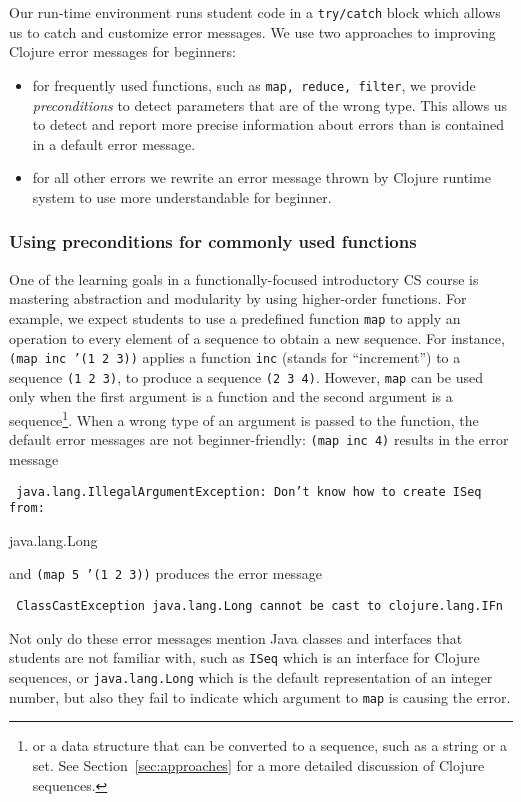 \documentclass[submission,copyright,creativecommons]{eptcs}
\newcommand{\clocode}[1]{{\tt {#1}}}
\begin{document}
Our run-time environment runs student code in a \clocode{try/catch} block which allows us to catch and customize error messages. 
We use two approaches to improving Clojure error messages for beginners:
\begin{itemize}
\item for frequently used functions, such as \clocode{map, reduce, filter}, we provide {\it preconditions}  to detect parameters that are of the wrong type. This allows us to detect and report more precise information about errors than is contained in a default error message. 
\item for all other errors we rewrite an error message thrown by Clojure runtime system to use more understandable for beginner. 
\end{itemize}

\subsubsection{Using preconditions for commonly used functions}\label{subsub:pre-cond}
One of the learning goals in a functionally-focused introductory CS course is mastering abstraction and modularity by using higher-order functions. For example, we expect students to use a predefined function \clocode{map} to apply an operation to every element of a sequence to obtain a new sequence. For instance, \clocode{(map inc '(1 2 3))} applies a function \clocode{inc} (stands for ``increment'') to a sequence \clocode{(1 2 3)}, to produce a sequence \clocode{(2 3 4)}. However, \clocode{map} can be used only when the first argument is a function and the second argument is a sequence\footnote{or a data structure that can be converted to a sequence, such as a string or a set. See Section~\ref{sec:approaches} for a more detailed discussion of Clojure sequences.}. When a wrong type of an argument is passed to the function, the default error messages are not beginner-friendly:
\clocode{(map inc 4)} results in the error message

{\tt
java.lang.IllegalArgumentException: Don't know how to create ISeq from: 

java.lang.Long
}

\noindent
and \clocode{(map 5 '(1 2 3))} produces the error message

{\tt 
ClassCastException java.lang.Long cannot be cast to clojure.lang.IFn  
}

Not only do these error messages mention Java classes and interfaces that students are not familiar with, such as {\tt ISeq} which is an interface for Clojure sequences, or {\tt java.lang.Long} which is the default representation of an integer number, but also they fail to indicate which argument to \clocode{map} is causing the error. 
\end{document}

